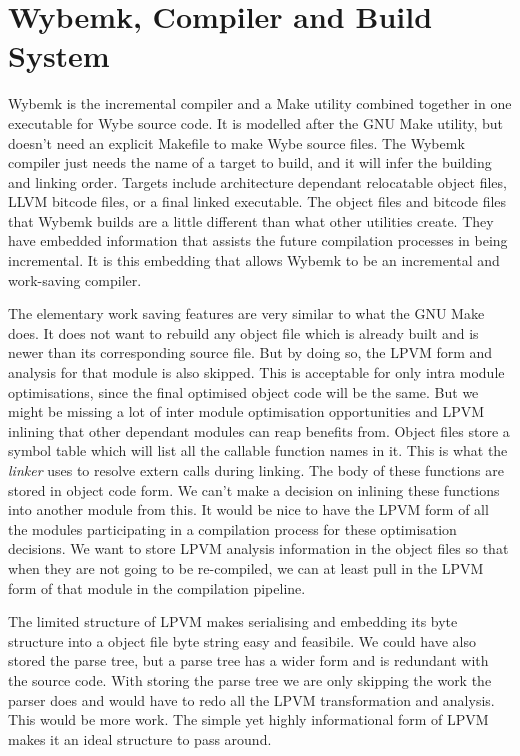 \chapter{Wybemk, Compiler and Build System}

Wybemk is the incremental compiler and a Make utility combined together in one
executable for Wybe source code. It is modelled after the GNU Make utility, but
doesn't need an explicit Makefile to make Wybe source files. The Wybemk
compiler just needs the name of a target to build, and it will infer the
building and linking order. Targets include architecture dependant relocatable
object files, LLVM bitcode files, or a final linked executable. The object
files and bitcode files that Wybemk builds are a little different than what
other utilities create. They have embedded information that assists the future
compilation processes in being incremental. It is this embedding that allows
Wybemk to be an incremental and work-saving compiler.

The elementary work saving features are very similar to what the GNU Make does.
It does not want to rebuild any object file which is already built and is newer
than its corresponding source file. But by doing so, the LPVM form and analysis
for that module is also skipped. This is acceptable for only intra module
optimisations, since the final optimised object code will be the same. But we
might be missing a lot of inter module optimisation opportunities and LPVM
inlining that other dependant modules can reap benefits from. Object files
store a symbol table which will list all the callable function names in
it. This is what the \textit{linker} uses to resolve extern calls during
linking. The body of these functions are stored in object code form. We can't
make a decision on inlining these functions into another module from this. It
would be nice to have the LPVM form of all the modules participating in a
compilation process for these optimisation decisions. We want to store LPVM
analysis information in the object files so that when they are not going to be
re-compiled, we can at least pull in the LPVM form of that module in the
compilation pipeline.

The limited structure of LPVM makes serialising and embedding its byte
structure into a object file byte string easy and feasibile. We could have also
stored the parse tree, but a parse tree has a wider form and is redundant with
the source code. With storing the parse tree we are only skipping the work the
parser does and would have to redo all the LPVM transformation and
analysis. This would be more work. The simple yet highly informational form of
LPVM makes it an ideal structure to pass around.


